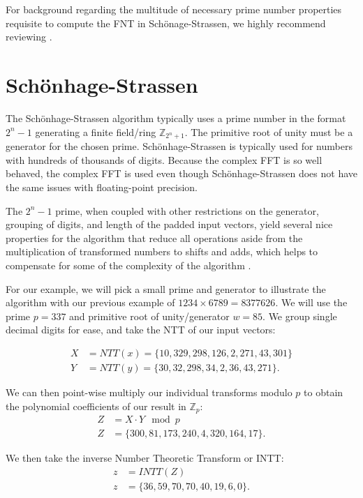 \documentclass[psamsfonts,reqno]{amsart}
\theoremstyle{definition}
\theoremstyle{remark}
\numberwithin{equation}{section}
\begin{document}
For background regarding the  multitude of necessary prime number properties requisite to compute the FNT in Sch\"{o}nage-Strassen, we highly recommend reviewing \cite{silverman2014friendly}.

\section{Sch\"{o}nhage-Strassen}

The Sch\"{o}nhage-Strassen algorithm typically uses a prime number in the format $2^n-1$ generating a finite field/ring  $\mathbb{Z}_{2^n+1}$. The primitive root of unity must be a generator for the chosen prime. Sch\"{o}nhage-Strassen is typically used for numbers with hundreds of thousands of digits. Because the complex FFT is so well behaved, the complex FFT is used even though Sch\"{o}nhage-Strassen does not have the same issues with floating-point precision.

The $2^n-1$ prime, when coupled with other restrictions on the generator, grouping of digits, and length of the padded input vectors, yield several nice properties for the algorithm that reduce all operations aside from the multiplication of transformed numbers to shifts and adds, which helps to compensate for some of the complexity of the algorithm \cite{crandall2005prime}.

For our example, we will pick a small prime and generator to illustrate the algorithm with our previous example of $\num{1234} \times \num{6789} = \num{8377626}$. We will use the prime $p = 337$ and primitive root of unity/generator $w = 85$. We group single decimal digits for ease, and take the NTT of our input vectors:

\begin{align*}
	X &= NTT(x) = \{10, 329, 298, 126, 2, 271, 43, 301\} \\
	Y &= NTT(y) = \{30, 32, 298, 34, 2, 36, 43, 271\}.
\end{align*}

We can then point-wise multiply our individual transforms modulo $p$ to obtain the polynomial coefficients of our result in $\mathbb{Z}_p$:
\begin{align*}
	Z &= X \cdot Y \mod{p} \\
	Z &= \{300, 81, 173, 240, 4, 320, 164, 17\}.
\end{align*}

We then take the inverse Number Theoretic Transform or INTT:
\begin{align*}
	z &= INTT(Z) \\
	z &= \{36, 59, 70, 70, 40, 19, 6, 0\}.
\end{align*}
\end{document}
